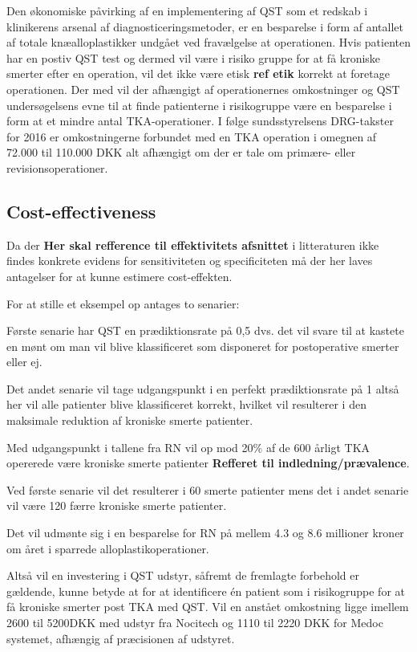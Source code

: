 Den økonomiske påvirking af en implementering af QST som et redskab i klinikerens arsenal af diagnosticeringsmetoder, er en besparelse i form af antallet af totale knæalloplastikker undgået ved fravælgelse at operationen. Hvis patienten har en postiv QST test og dermed vil være i risiko gruppe for at få kroniske smerter efter en operation, vil det ikke være etisk \textbf{ref etik } korrekt at foretage operationen. Der med vil der afhængigt af operationernes omkostninger og QST undersøgelsens evne til at finde patienterne i risikogruppe være en besparelse i form at et mindre antal TKA-operationer. I følge sundsstyrelsens DRG-takster for 2016 er omkostningerne forbundet med en TKA operation i omegnen af 72.000 til 110.000 DKK alt afhængigt om der er tale om primære- eller revisionsoperationer.\citep{Takst2016}


\subsection{Cost-effectiveness}

Da der \textbf{Her skal refference til effektivitets afsnittet} i litteraturen ikke findes konkrete evidens for sensitiviteten og specificiteten må der her laves antagelser for at kunne estimere cost-effekten. 
 
For at stille et eksempel op antages to senarier:

Første senarie har QST en prædiktionsrate på 0,5 dvs. det vil svare til at kastete en mønt om man vil blive klassificeret som disponeret for postoperative smerter eller ej.

Det andet senarie vil tage udgangspunkt i en perfekt prædiktionsrate på 1 altså her vil alle patienter blive klassificeret korrekt, hvilket vil resulterer i den maksimale  reduktion af kroniske smerte patienter.

Med udgangspunkt i tallene fra RN vil op mod 20\% af de 600 årligt TKA opererede være kroniske smerte patienter \textbf{Refferet til indledning/prævalence}.

Ved første senarie vil det resulterer i 60 smerte patienter mens det i andet senarie vil være 120 færre kroniske smerte patienter. 

Det vil udmønte sig i en besparelse for RN på mellem 4.3 og 8.6 millioner kroner om året i sparrede alloplastikoperationer. 

Altså vil en investering i QST udstyr, såfremt de fremlagte forbehold er gældende, kunne betyde at for at identificere én patient som i risikogruppe for at få kroniske smerter post TKA med QST. Vil en anstået omkostning ligge imellem 2600 til 5200DKK med udstyr fra Nocitech og 1110 til 2220 DKK for Medoc systemet, afhængig af præcisionen af udstyret.  



